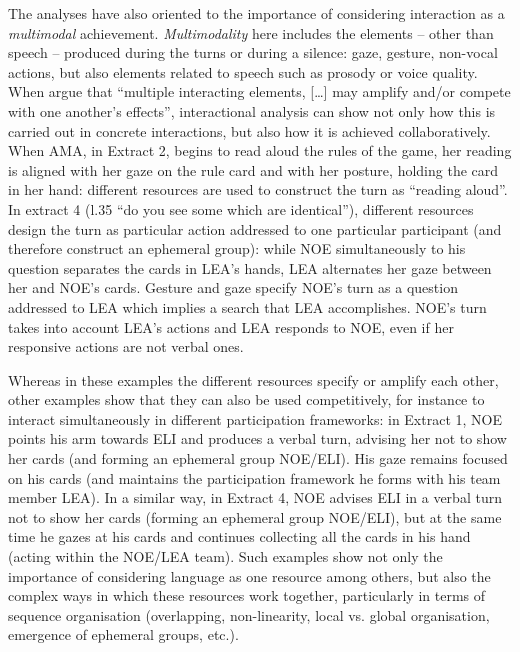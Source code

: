 \documentclass[output=paper]{langscibook}
\begin{document}
The analyses have also oriented to the importance of considering interaction as a \textit{multimodal} achievement. \textit{Multimodality} here includes the elements -- other than speech -- produced during the turns or during a silence: gaze, gesture, non-vocal actions, but also elements related to speech such as prosody or voice quality. When \citet[16]{BecknerEtAl2009} argue that “multiple interacting elements, […] may amplify and/or compete with one another’s effects”, interactional analysis can show not only how this is carried out in concrete interactions, but also how it is achieved collaboratively. When AMA, in Extract 2, begins to read aloud the rules of the game, her reading is aligned with her gaze on the rule card and with her posture, holding the card in her hand: different resources are used to construct the turn as “reading aloud”. In extract 4 (l.35 “do you see some which are identical”), different resources design the turn as particular action addressed to one particular participant (and therefore construct an ephemeral group): while NOE simultaneously to his question separates the cards in LEA’s hands, LEA alternates her gaze between her and NOE’s cards. Gesture and gaze specify NOE’s turn as a question addressed to LEA which implies a search that LEA accomplishes. NOE’s turn takes into account LEA’s actions and LEA responds to NOE, even if her responsive actions are not verbal ones.

Whereas in these examples the different resources specify or amplify each other, other examples show that they can also be used competitively, for instance to interact simultaneously in different participation frameworks: in Extract 1, NOE points his arm towards ELI and produces a verbal turn, advising her not to show her cards (and forming an ephemeral group NOE\slash ELI). His gaze remains focused on his cards (and maintains the participation framework he forms with his team member LEA). In a similar way, in Extract 4, NOE advises ELI in a verbal turn not to show her cards (forming an ephemeral group NOE\slash ELI), but at the same time he gazes at his cards and continues collecting all the cards in his hand (acting within the NOE\slash LEA team). Such examples show not only the importance of considering language as one resource among others, but also the complex ways in which these resources work together, particularly in terms of sequence organisation (overlapping, non-linearity, local vs. global organisation, emergence of ephemeral groups, etc.). 
\end{document}
